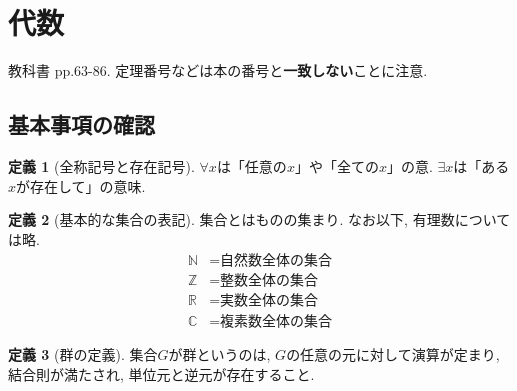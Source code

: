 \documentclass[a4j,dvipdfmx]{jsarticle}
\theoremstyle{definition}
\newtheorem{definition}{定義}
\theoremstyle{definition}
\theoremstyle{definition}
\begin{document}
    \section*{代数}
        教科書 pp.63-86. 定理番号などは本の番号と\textbf{一致しない}ことに注意.
        \subsection*{基本事項の確認}
            \begin{definition}[全称記号と存在記号]
                $\forall x$は「任意の$x$」や「全ての$x$」の意. $\exists x$は「ある$x$が存在して」の意味.
            \end{definition}
            \begin{definition}[基本的な集合の表記]集合とはものの集まり. なお以下, 有理数については略.
                \begin{align*}
                    \mathbb{N}&=\text{自然数全体の集合}\\
                    \mathbb{Z}&=\text{整数全体の集合}\\
                    \mathbb{R}&=\text{実数全体の集合}\\
                    \mathbb{C}&=\text{複素数全体の集合}
                \end{align*}
            \end{definition}

            \begin{definition}[群の定義]
                集合$G$が群というのは, $G$の任意の元に対して演算が定まり, 結合則が満たされ, 単位元と逆元が存在すること.
            \end{definition}
\end{document}
